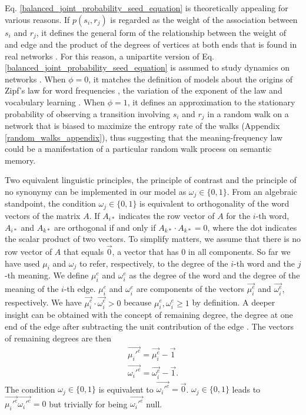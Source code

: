 \documentclass{article}
\begin{document}
Eq. \ref{balanced_joint_probability_seed_equation} is theoretically appealing for various reasons. If $p(s_i, r_j)$ is regarded as the weight of the association between $s_i$ and $r_j$, it defines the general form of the relationship between the weight of and edge and the product of the degrees of vertices at both ends that is found in real networks \cite{Barrat2004a}. %
For this reason, a unipartite version of Eq. \ref{balanced_joint_probability_seed_equation} is assumed to study dynamics on networks \cite{Baronchelli2011a}.   
When $\phi = 0$, it matches the definition of models about the origins of Zipf's law for word frequencies \cite{Ferrer2004e}, the variation of the exponent of the law \cite{Ferrer2004a,Ferrer2005e} and vocabulary learning \cite{Ferrer2013g}. When $\phi = 1$, it defines an approximation to the stationary probability of observing a transition involving $s_i$ and $r_j$ in a random walk on a network that is biased to maximize the entropy rate of the walks (Appendix \ref{random_walks_appendix}), thus suggesting that the meaning-frequency law 
could be a manifestation of a particular random walk process on semantic memory.


Two equivalent linguistic principles, the principle of contrast \cite{Clark1987a} and the principle of no synonymy \cite[p. 67]{Goldberg1995} can be implemented in our model as $\omega_j \in \{0,1\}$. From an algebraic standpoint, the condition $\omega_j \in \{0,1\}$ is equivalent to orthogonality of the word vectors of the matrix $A$. If $A_{i*}$ indicates the row vector of $A$ for the $i$-th word, $A_{i*}$ and $A_{k*}$ are orthogonal if and only if $A_{k*} \cdot A_{k*}=0$, where the dot indicates the scalar product of two vectors. To simplify matters, we assume that there is no row vector of $A$ that equals $\vec{0}$, a vector that has $0$ in all components. So far we have used $\mu_i$ and $\omega_j$ to refer, respectively, to the degree of the $i$-th word and the $j$-th meaning. We define $\mu_i^e$ and $\omega_i^e$ as the degree of the word and the degree of the meaning of the $i$-th edge. $\mu_i^e$ and $\omega_i^e$ are components of the vectors $\vec{\mu_i^e}$ and $\vec{\omega_i^e}$, respectively. We have $\vec{\mu_i^e} \cdot \vec{\omega_i^e} >0$ because $\mu_i^e, \omega_i^e \geq 1$ by definition. A deeper insight can be obtained with the concept of remaining degree, the degree at one end of the edge after subtracting the unit contribution of the edge \cite{Newman2002a}. The vectors of remaining degrees are then
\begin{eqnarray*}
\vec{\mu_i'^e} = \vec{\mu_i^e} - \vec{1}\\
\vec{\omega_i'^e} = \vec{\omega_i^e} - \vec{1}.
\end{eqnarray*}
The condition $\omega_j \in \{0,1\}$ is equivalent to $\vec{\omega_i'^e} = \vec{0}$. $\omega_j \in \{0,1\}$ leads to $\vec{\mu_i'^e}\vec{\omega_i'^e} = 0$ but trivially for being $\vec{\omega_i'^e}$ null.
\end{document}
